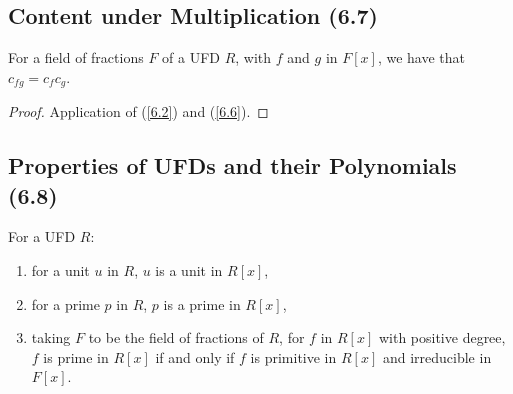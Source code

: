 \subsection{Content under Multiplication (6.7)} \label{6.7}

For a field of fractions $F$ of a UFD $R$, with $f$ and $g$ in $F[x]$, we have that
$c_{fg} = c_fc_g$.

\begin{proof}
    Application of (\ref{6.2}) and (\ref{6.6}).
\end{proof}

\subsection{Properties of UFDs and their Polynomials (6.8)} \label{6.8}

For a UFD $R$: \begin{enumerate}
    \item for a unit $u$ in $R$, $u$ is a unit in $R[x]$,
    \item for a prime $p$ in $R$, $p$ is a prime in $R[x]$,
    \item taking $F$ to be the field of fractions of $R$, for $f$ in $R[x]$
        with positive degree, $f$ is prime in $R[x]$ if and only if $f$ is
        primitive in $R[x]$ and irreducible in $F[x]$.
\end{enumerate}

